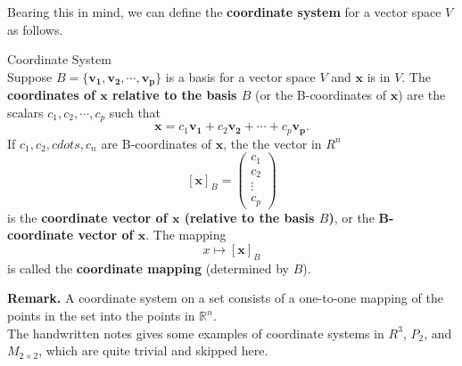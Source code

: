 \documentclass[10pt, a4paper]{article}
\newcommand{\R}{\mathbb{R}}
\newcommand{\vt}[1]{\mathbf{#1}}
\begin{document}
Bearing this in mind, we can define the \textbf{coordinate system} for a vector space $V$ as follows.
\begin{definition} Coordinate System\\
    Suppose $B=\{\vt{v_1}, \vt{v_2}, \cdots, \vt{v_p}\}$ is a basis for a vector space $V$ and $\vt{x}$ is in $V$. The \textbf{coordinates of $\vt{x}$ relative to the basis $B$} (or the B-coordinates of $\vt{x}$) are the scalars $c_1, c_2, \cdots, c_p$ such that \[
    \vt{x} = c_1\vt{v_1} + c_2\vt{v_2} + \cdots + c_p\vt{v_p}.
    \]
    If $c_1, c_2, cdots, c_n$ are B-coordinates of $\vt{x}$, the the vector in $R^n$ \[
    [\vt{x}]_B = \begin{pmatrix}
        c_1\\c_2\\\vdots\\c_p
    \end{pmatrix}
    \]
    is the \textbf{coordinate vector of $\vt{x}$ (relative to the basis $B$)}, or the \textbf{B-coordinate vector of $\vt{x}$}. The mapping \[
    x\mapsto [\vt{x}]_B
    \]
    is called the \textbf{coordinate mapping} (determined by $B$).
\end{definition}
\indent\textbf{Remark.} A coordinate system on a set consists of a one-to-one mapping of the points in the set into the points in $\R^n$.\\
\indent The handwritten notes gives some examples of coordinate systems in $R^3$, $P_2$, and $M_{2\times 2}$, which are quite trivial and skipped here.
\end{document}
